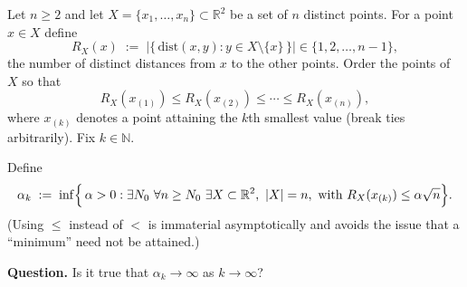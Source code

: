 Let $n\ge 2$ and let $X=\{x_1,\dots,x_n\}\subset \mathbb{R}^2$ be a set of $n$ distinct points.
For a point $x\in X$ define
\[
R_X(x)\;:=\;\left\lvert \{\,\mathrm{dist}(x,y): y\in X\setminus\{x\}\,\} \right\rvert\in\{1,2,\dots,n-1\},
\]
the number of distinct distances from $x$ to the other points.
Order the points of $X$ so that
\[
R_X(x_{(1)})\le R_X(x_{(2)})\le \cdots \le R_X(x_{(n)}),
\]
where $x_{(k)}$ denotes a point attaining the $k$th smallest value (break ties arbitrarily).
Fix $k\in\mathbb{N}$.

Define
\[
\alpha_k\;:=\;\inf\Bigl\{\,\alpha>0:\exists N_0\ \forall n\ge N_0\ \exists X\subset\mathbb{R}^2,\ \left\lvert X \right\rvert=n,\ \text{with }R_X(x_{(k)})\le \alpha\sqrt n\Bigr\}.
\]
(Using $\le$ instead of $<$ is immaterial asymptotically and avoids the issue that a ``minimum'' need not be attained.)

\medskip
\noindent
\textbf{Question.} Is it true that $\alpha_k\to\infty$ as $k\to\infty$?
